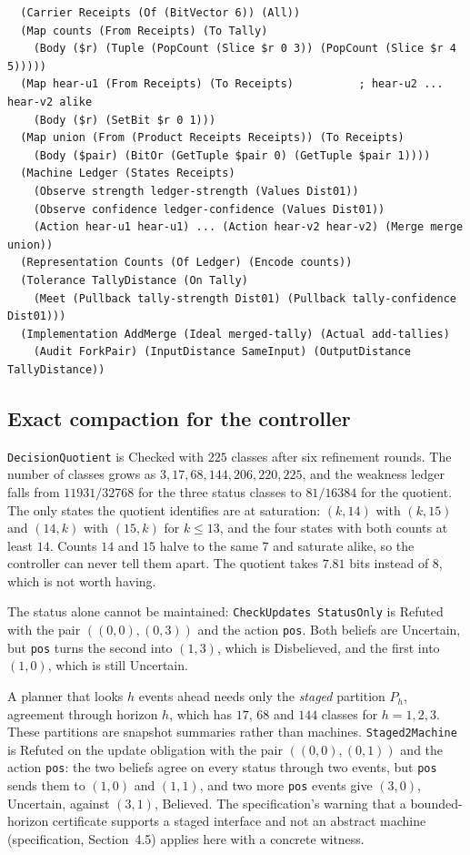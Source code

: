 \documentclass[11pt]{article}
\newcommand{\code}[1]{\texttt{#1}}
\newcommand{\spec}[1]{specification, Section~#1}
\theoremstyle{definition}
\theoremstyle{plain}
\begin{document}
\begin{lstlisting}
  (Carrier Receipts (Of (BitVector 6)) (All))
  (Map counts (From Receipts) (To Tally)
    (Body ($r) (Tuple (PopCount (Slice $r 0 3)) (PopCount (Slice $r 4 5)))))
  (Map hear-u1 (From Receipts) (To Receipts)          ; hear-u2 ... hear-v2 alike
    (Body ($r) (SetBit $r 0 1)))
  (Map union (From (Product Receipts Receipts)) (To Receipts)
    (Body ($pair) (BitOr (GetTuple $pair 0) (GetTuple $pair 1))))
  (Machine Ledger (States Receipts)
    (Observe strength ledger-strength (Values Dist01))
    (Observe confidence ledger-confidence (Values Dist01))
    (Action hear-u1 hear-u1) ... (Action hear-v2 hear-v2) (Merge merge union))
  (Representation Counts (Of Ledger) (Encode counts))
  (Tolerance TallyDistance (On Tally)
    (Meet (Pullback tally-strength Dist01) (Pullback tally-confidence Dist01)))
  (Implementation AddMerge (Ideal merged-tally) (Actual add-tallies)
    (Audit ForkPair) (InputDistance SameInput) (OutputDistance TallyDistance))
\end{lstlisting}

\subsection{Exact compaction for the controller}

\code{DecisionQuotient} is Checked with $225$ classes after six refinement rounds. The number of
classes grows as $3, 17, 68, 144, 206, 220, 225$, and the weakness ledger falls from
$11931/32768$ for the three status classes to $81/16384$ for the quotient. The only states the
quotient identifies are at saturation: $(k,14)$ with $(k,15)$ and $(14,k)$ with $(15,k)$ for
$k\le13$, and the four states with both counts at least $14$. Counts $14$ and $15$ halve to the
same $7$ and saturate alike, so the controller can never tell them apart. The quotient takes
$7.81$ bits instead of $8$, which is not worth having.

The status alone cannot be maintained: \code{CheckUpdates StatusOnly} is Refuted with the pair
$((0,0),(0,3))$ and the action \code{pos}. Both beliefs are Uncertain, but \code{pos} turns the
second into $(1,3)$, which is Disbelieved, and the first into $(1,0)$, which is still Uncertain.

A planner that looks $h$ events ahead needs only the \emph{staged} partition $P_h$, agreement
through horizon $h$, which has $17$, $68$ and $144$ classes for $h=1,2,3$. These partitions are
snapshot summaries rather than machines. \code{Staged2Machine} is Refuted on the update obligation
with the pair $((0,0),(0,1))$ and the action \code{pos}: the two beliefs agree on every status
through two events, but \code{pos} sends them to $(1,0)$ and $(1,1)$, and two more \code{pos} events
give $(3,0)$, Uncertain, against $(3,1)$, Believed. The specification's warning that a
bounded-horizon certificate supports a staged interface and not an abstract machine
(\spec{4.5}) applies here with a concrete witness.
\end{document}
